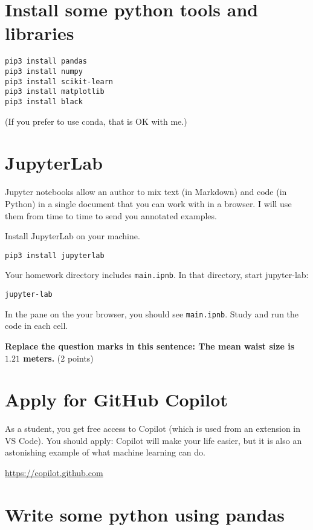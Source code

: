 \documentclass[11pt,english]{article}
\begin{document}
\section{Install some python tools and libraries}

\begin{Verbatim}
pip3 install pandas
pip3 install numpy
pip3 install scikit-learn
pip3 install matplotlib
pip3 install black
\end{Verbatim}

(If you prefer to use conda,  that is OK with me.)

\section{JupyterLab}

Jupyter notebooks allow an author to mix text (in Markdown) and code (in Python)
in a single document that you can work with in a browser.   I will use them from time to
time to send you annotated examples.

Install JupyterLab on your machine.

\begin{Verbatim}
pip3 install jupyterlab
\end{Verbatim}

Your homework directory includes  \texttt{main.ipnb}. In that directory,  start jupyter-lab:
\begin{Verbatim}
jupyter-lab
\end{Verbatim}

In the pane on the  your browser,  you should see \texttt{main.ipnb}.   Study and run the code in each cell.

\textbf{Replace the question marks in this sentence: The mean waist size is $1.21$ meters.} (2 points)

\section{Apply for GitHub Copilot}

As a student,  you get free access to Copilot (which is used from an extension in VS Code).
You should apply: Copilot will make your life easier,  but it is also an astonishing example of what machine learning can do.

\url{https://copilot.github.com}

\section{Write some python using pandas}
\end{document}
